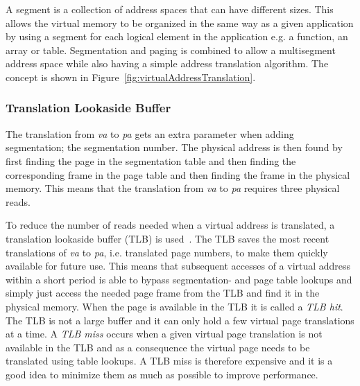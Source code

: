 A segment is a collection of address spaces that can have different sizes.
This allows the virtual memory to be organized in the same way as a given application by using a segment for each logical element in the application e.g. a function, an array or table.
Segmentation and paging is combined to allow a multisegment address space while also having a simple address translation algorithm. 
The concept is shown in Figure~\ref{fig:virtualAddressTranslation}.

\subsubsection{Translation Lookaside Buffer}
The translation from \textit{va} to \textit{pa} gets an extra parameter when adding segmentation; the segmentation number.
The physical address is then found by first finding the page in the segmentation table and then finding the corresponding frame in the page table and then finding the frame in the physical memory. 
This means that the translation from \textit{va} to \textit{pa} requires three physical reads.

To reduce the number of reads needed when a virtual address is translated, a translation lookaside buffer (TLB) is used~.
The TLB saves the most recent translations of \textit{va} to \textit{pa}, i.e. translated page numbers, to make them quickly available for future use.
This means that subsequent accesses of a virtual address within a short period is able to bypass segmentation- and page table lookups and simply just access the needed page frame from the TLB and find it in the physical memory.
When the page is available in the TLB it is called a \textit{TLB hit}.
The TLB is not a large buffer and it can only hold a few virtual page translations at a time. 
A \textit{TLB miss} occurs when a given virtual page translation is not available in the TLB and as a consequence the virtual page needs to be translated using table lookups. 
A TLB miss is therefore expensive and it is a good idea to minimize them as much as possible to improve performance.
